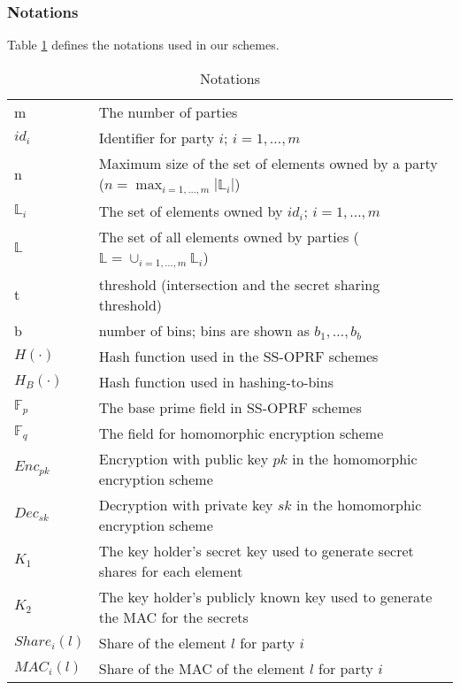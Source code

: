 \subsubsection{Notations} 
Table \ref{tab:Notations} defines the notations used in our schemes. 
\begin{table}[h!]
  \centering
  \caption{Notations}
  \label{tab:Notations}
  \begin{tabular}{ll}
    \toprule
     &  \\
    \midrule
    m & The number of parties \\
    $id_i$ &  Identifier for party $i$; $i = 1, \dots, m$\\
    n &  Maximum size of the set of elements owned by a party ($n = \max_{i = 1, \dots, m}{|\mathbb{L}_i|}$)\\
    $\mathbb{L}_i$ & The set of elements owned by $id_i$; $i = 1, \dots, m$\\
    $\mathbb{L}$ & The set of all elements owned by parties ($\mathbb{L} = \cup_{i = 1, \dots, m}{\mathbb{L}_i}$)\\
    t &  threshold (intersection and the secret sharing threshold)\\
    b &  number of bins; bins are shown as $b_1, \dots, b_b$\\
    $H(\cdot)$ & Hash function used in the SS-OPRF schemes\\
    $H_B(\cdot)$ & Hash function used in hashing-to-bins\\
    $\mathbb{F}_p$ & The base prime field in SS-OPRF schemes\\
    $\mathbb{F}_q$ & The field for homomorphic encryption scheme\\
    $Enc_{pk}$ &  Encryption with public key $pk$ in the homomorphic encryption scheme\\
    $Dec_{sk}$ &  Decryption with private key $sk$ in the homomorphic encryption scheme\\   
    $K_1$ & The key holder's secret key used to generate secret shares for each element\\
    $K_2$ & The key holder's publicly known key used to generate the MAC for the secrets \\
    $Share_i(l)$ & Share of the element $l$ for party $i$\\
    $MAC_i(l)$ & Share of the MAC of the element $l$ for party $i$\\
    \bottomrule
  \end{tabular}
\end{table}

